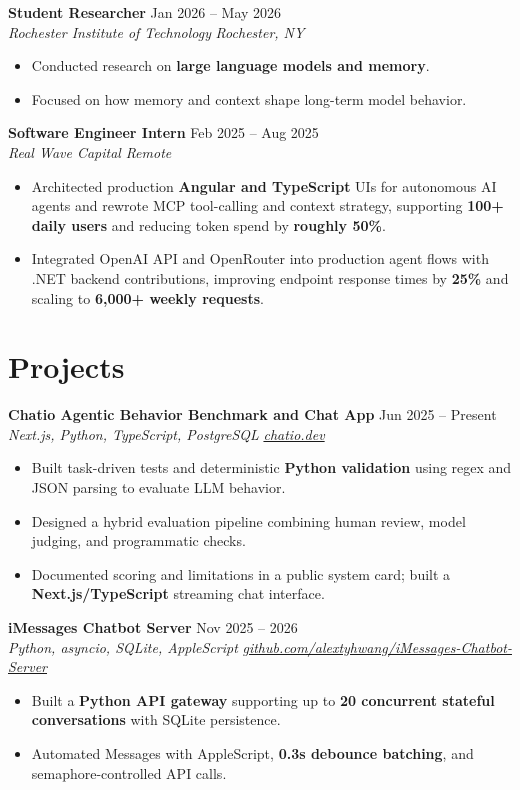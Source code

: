 \documentclass[10pt,letterpaper]{article}
\newif\ifresumeFirstRole
\newcommand{\resumeRole}[4]{%
  \ifresumeFirstRole
    \global\resumeFirstRolefalse
  \else
    \vspace{0pt plus 1fill}%
  \fi
  \textbf{#1} \hfill #2\\
  \textit{#3} \hfill \textit{#4}
}
\begin{document}
\resumeRole{Student Researcher}{Jan 2026 -- May 2026}{Rochester Institute of Technology}{Rochester, NY}
\begin{itemize}
  \item Conducted research on \textbf{large language models and memory}.
  \item Focused on how memory and context shape long-term model behavior.
\end{itemize}

\resumeRole{Software Engineer Intern}{Feb 2025 -- Aug 2025}{Real Wave Capital}{Remote}
\begin{itemize}
  \item Architected production \textbf{Angular and TypeScript} UIs for autonomous AI agents and rewrote MCP tool-calling and context strategy, supporting \textbf{100+ daily users} and reducing token spend by \textbf{roughly 50\%}.
  \item Integrated OpenAI API and OpenRouter into production agent flows with .NET backend contributions, improving endpoint response times by \textbf{25\%} and scaling to \textbf{6,000+ weekly requests}.
\end{itemize}

\section*{Projects}
\resumeRole{Chatio Agentic Behavior Benchmark and Chat App}{Jun 2025 -- Present}{Next.js, Python, TypeScript, PostgreSQL}{\href{https://chatio.dev}{chatio.dev}}
\begin{itemize}
  \item Built task-driven tests and deterministic \textbf{Python validation} using regex and JSON parsing to evaluate LLM behavior.
  \item Designed a hybrid evaluation pipeline combining human review, model judging, and programmatic checks.
  \item Documented scoring and limitations in a public system card; built a \textbf{Next.js/TypeScript} streaming chat interface.
\end{itemize}

\resumeRole{iMessages Chatbot Server}{Nov 2025 -- 2026}{Python, asyncio, SQLite, AppleScript}{\href{https://github.com/alextyhwang/iMessages-Chatbot-Server}{github.com/alextyhwang/iMessages-Chatbot-Server}}
\begin{itemize}
  \item Built a \textbf{Python API gateway} supporting up to \textbf{20 concurrent stateful conversations} with SQLite persistence.
  \item Automated Messages with AppleScript, \textbf{0.3s debounce batching}, and semaphore-controlled API calls.
\end{itemize}
\end{document}
